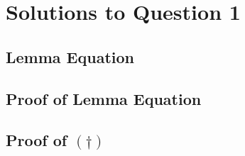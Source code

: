 \documentclass[a4paper,12pt]{article}
\numberwithin{equation}{subsection}
\begin{document}
\section{Solutions to Question 1}
\subsection{Lemma Equation}

\subsection{Proof of Lemma Equation}
\subsection{Proof of \((\dagger)\)}


% 
% 
% 
\end{document}
